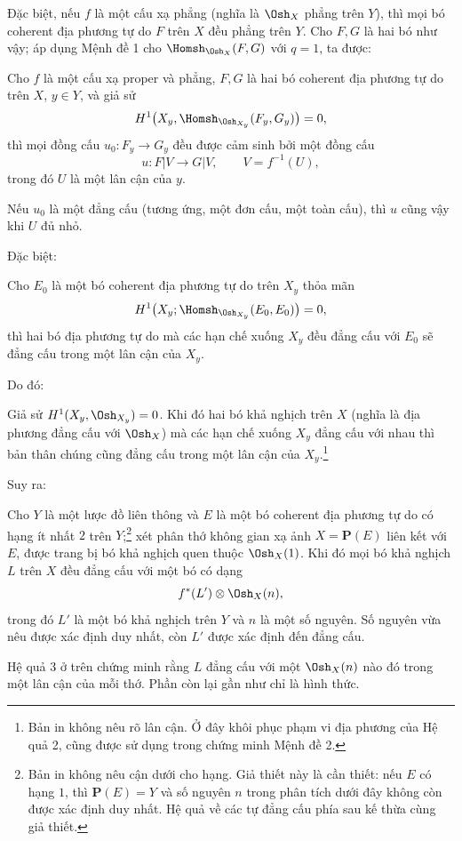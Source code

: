 Đặc biệt, nếu $f$ là một cấu xạ phẳng (nghĩa là $\Osh_X$ phẳng trên $Y$), thì
mọi bó coherent địa phương tự do $F$ trên $X$ đều phẳng trên $Y$. Cho $F,G$ là
hai bó như vậy; áp dụng Mệnh đề 1 cho $\Homsh_{\Osh_X}(F,G)$ với $q=1$, ta
được:

 Cho $f$ là một cấu xạ proper và phẳng, $F,G$ là hai bó
coherent địa phương tự do trên $X$, $y\in Y$, và giả sử
\[
  H^1\bigl(X_y,\Homsh_{\Osh_{X_y}}(F_y,G_y)\bigr)=0,
\]
thì mọi đồng cấu $u_0:F_y\longrightarrow G_y$ đều được cảm sinh bởi một đồng
cấu
\[
  u:F|V\longrightarrow G|V,
  \qquad V=f^{-1}(U),
\]
trong đó $U$ là một lân cận của $y$.

 Nếu $u_0$ là một đẳng cấu (tương ứng, một đơn cấu, một toàn
cấu), thì $u$ cũng vậy khi $U$ đủ nhỏ.

Đặc biệt:

 Cho $E_0$ là một bó coherent địa phương tự do trên $X_y$
thỏa mãn
\[
  H^1\bigl(X_y;\Homsh_{\Osh_{X_y}}(E_0,E_0)\bigr)=0,
\]
thì hai bó địa phương tự do mà các hạn chế xuống $X_y$ đều đẳng cấu
với $E_0$ sẽ đẳng cấu trong một lân cận của $X_y$.

Do đó:

 Giả sử $H^1(X_y,\Osh_{X_y})=0$. Khi đó hai bó khả nghịch
trên $X$ (nghĩa là địa phương đẳng cấu với $\Osh_X$) mà các hạn chế xuống
$X_y$ đẳng cấu với nhau thì bản thân chúng cũng đẳng cấu trong một lân cận của $X_y$.\footnote{Bản in không nêu rõ lân cận. Ở đây khôi phục phạm vi địa phương của Hệ quả 2, cũng được sử dụng trong chứng minh Mệnh đề 2.}

Suy ra:

 Cho $Y$ là một lược đồ liên thông và $E$ là một bó
coherent địa phương tự do có hạng ít nhất $2$ trên $Y$;\footnote{Bản in không
nêu cận dưới cho hạng. Giả thiết này là cần thiết: nếu $E$ có
hạng $1$, thì $\mathbf P(E)=Y$ và số nguyên $n$ trong phân tích dưới đây không
còn được xác định duy nhất. Hệ quả về các tự đẳng cấu phía sau kế thừa cùng
giả thiết.} xét phân thớ không gian xạ ảnh $X=\mathbf P(E)$ liên kết với $E$,
được trang bị bó khả nghịch quen thuộc $\Osh_X(1)$. Khi đó mọi bó khả nghịch
$L$ trên $X$ đều đẳng cấu với một bó có dạng
\[
  f^*(L')\otimes\Osh_X(n),
\]
trong đó $L'$ là một bó khả nghịch trên $Y$ và $n$ là một số nguyên. Số nguyên
vừa nêu được xác định duy nhất, còn $L'$ được xác định đến đẳng cấu.

Hệ quả 3 ở trên chứng minh rằng $L$ đẳng cấu với một $\Osh_X(n)$ nào đó trong
một lân cận của mỗi thớ. Phần còn lại gần như chỉ là hình thức.

